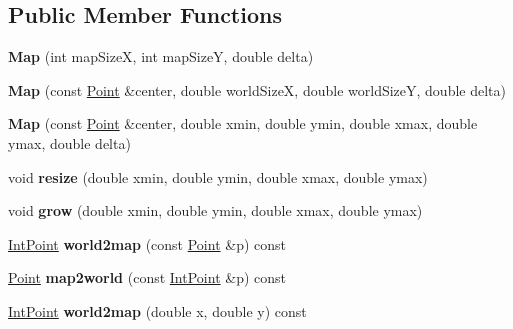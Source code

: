 \subsection*{Public Member Functions}
\begin{DoxyCompactItemize}
\item 
\mbox{\label{classGMapping_1_1Map_a36bacfcd3fc3fabc5fe7617754b25567}} 
{\bfseries Map} (int map\+SizeX, int map\+SizeY, double delta)
\item 
\mbox{\label{classGMapping_1_1Map_a0ea4f04959c874b7c3086d96fac30236}} 
{\bfseries Map} (const \hyperlink{structGMapping_1_1point}{Point} \&center, double world\+SizeX, double world\+SizeY, double delta)
\item 
\mbox{\label{classGMapping_1_1Map_a6703b56ce15339cb9d9603f61332bfc1}} 
{\bfseries Map} (const \hyperlink{structGMapping_1_1point}{Point} \&center, double xmin, double ymin, double xmax, double ymax, double delta)
\item 
\mbox{\label{classGMapping_1_1Map_a89c4799297d5231a5bae0a0eef9adc28}} 
void {\bfseries resize} (double xmin, double ymin, double xmax, double ymax)
\item 
\mbox{\label{classGMapping_1_1Map_af79403cb4804e75ed16aeaf78bcfcfee}} 
void {\bfseries grow} (double xmin, double ymin, double xmax, double ymax)
\item 
\mbox{\label{classGMapping_1_1Map_aa0cdf0d1af8991704693ac78a0d83d5a}} 
\hyperlink{structGMapping_1_1point}{Int\+Point} {\bfseries world2map} (const \hyperlink{structGMapping_1_1point}{Point} \&p) const
\item 
\mbox{\label{classGMapping_1_1Map_a4a3caa104a1a6faf240001279e92199b}} 
\hyperlink{structGMapping_1_1point}{Point} {\bfseries map2world} (const \hyperlink{structGMapping_1_1point}{Int\+Point} \&p) const
\item 
\mbox{\label{classGMapping_1_1Map_a182b2bc4ae28c064176c745437eac2cd}} 
\hyperlink{structGMapping_1_1point}{Int\+Point} {\bfseries world2map} (double x, double y) const

\end{DoxyCompactItemize}
